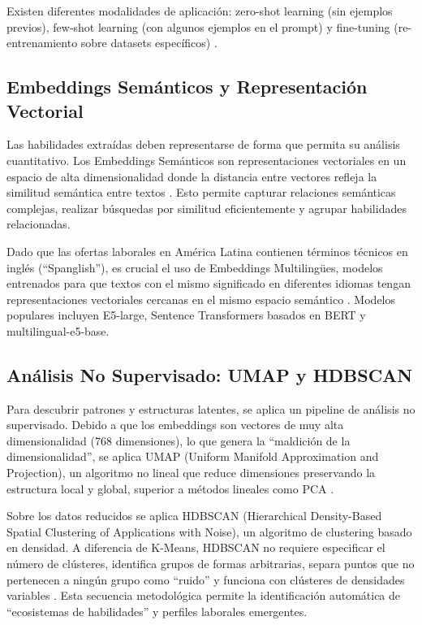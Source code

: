 Existen diferentes modalidades de aplicación: zero-shot learning (sin ejemplos previos), few-shot learning (con algunos ejemplos en el prompt) \cite{nguyen2024} y fine-tuning (re-entrenamiento sobre datasets específicos) \cite{herandi2024, zhang2022}.

\subsection{Embeddings Semánticos y Representación Vectorial}

Las habilidades extraídas deben representarse de forma que permita su análisis cuantitativo. Los Embeddings Semánticos son representaciones vectoriales en un espacio de alta dimensionalidad donde la distancia entre vectores refleja la similitud semántica entre textos \cite{kavas2024}. Esto permite capturar relaciones semánticas complejas, realizar búsquedas por similitud eficientemente y agrupar habilidades relacionadas.

Dado que las ofertas laborales en América Latina contienen términos técnicos en inglés (``Spanglish''), es crucial el uso de Embeddings Multilingües, modelos entrenados para que textos con el mismo significado en diferentes idiomas tengan representaciones vectoriales cercanas en el mismo espacio semántico \cite{echeverria2022, kavas2024}. Modelos populares incluyen E5-large, Sentence Transformers basados en BERT y multilingual-e5-base.

\subsection{Análisis No Supervisado: UMAP y HDBSCAN}

Para descubrir patrones y estructuras latentes, se aplica un pipeline de análisis no supervisado. Debido a que los embeddings son vectores de muy alta dimensionalidad (768 dimensiones), lo que genera la ``maldición de la dimensionalidad'', se aplica UMAP (Uniform Manifold Approximation and Projection), un algoritmo no lineal que reduce dimensiones preservando la estructura local y global, superior a métodos lineales como PCA \cite{lukauskas2023}.

Sobre los datos reducidos se aplica HDBSCAN (Hierarchical Density-Based Spatial Clustering of Applications with Noise), un algoritmo de clustering basado en densidad. A diferencia de K-Means, HDBSCAN no requiere especificar el número de clústeres, identifica grupos de formas arbitrarias, separa puntos que no pertenecen a ningún grupo como ``ruido'' y funciona con clústeres de densidades variables \cite{lukauskas2023}. Esta secuencia metodológica permite la identificación automática de ``ecosistemas de habilidades'' y perfiles laborales emergentes.

